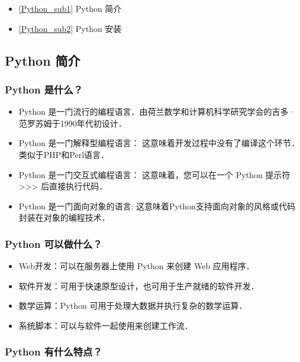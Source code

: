 
\begin{itemize}
\item \autoref{Python_sub1} Python 简介
\item \autoref{Python_sub2} Python 安装
\end{itemize}

\subsection{Python 简介}\label{Python_sub1}

\subsubsection{Python 是什么？}

\begin{itemize}
\item Python 是一门流行的编程语言．由荷兰数学和计算机科学研究学会的吉多·范罗苏姆于1990年代初设计．
\item Python 是一门解释型编程语言： 这意味着开发过程中没有了编译这个环节．类似于PHP和Perl语言．
\item Python 是一门交互式编程语言： 这意味着，您可以在一个 Python 提示符 >>> 后直接执行代码．
\item Python 是一门面向对象的语言: 这意味着Python支持面向对象的风格或代码封装在对象的编程技术．
\end{itemize}
 
\subsubsection{Python 可以做什么？}
\begin{itemize}
\item Web开发：可以在服务器上使用 Python 来创建 Web 应用程序．
\item 软件开发：可用于快速原型设计，也可用于生产就绪的软件开发．
\item 数学运算：Python 可用于处理大数据并执行复杂的数学运算．
\item 系统脚本：可以与软件一起使用来创建工作流．
\end{itemize}

\subsubsection{Python 有什么特点？}

